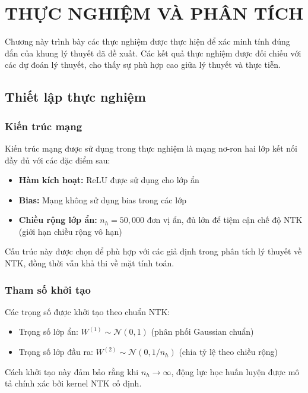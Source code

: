 \chapter{THỰC NGHIỆM VÀ PHÂN TÍCH}

Chương này trình bày các thực nghiệm được thực hiện để xác minh tính đúng đắn của khung lý thuyết đã đề xuất. Các kết quả thực nghiệm được đối chiếu với các dự đoán lý thuyết, cho thấy sự phù hợp cao giữa lý thuyết và thực tiễn.

\section{Thiết lập thực nghiệm}

\subsection{Kiến trúc mạng}

Kiến trúc mạng được sử dụng trong thực nghiệm là mạng nơ-ron hai lớp kết nối đầy đủ với các đặc điểm sau:
\begin{itemize}
    \item \textbf{Hàm kích hoạt:} ReLU được sử dụng cho lớp ẩn
    \item \textbf{Bias:} Mạng không sử dụng bias trong các lớp
    \item \textbf{Chiều rộng lớp ẩn:} $n_h = 50,000$ đơn vị ẩn, đủ lớn để tiệm cận chế độ NTK (giới hạn chiều rộng vô hạn)
\end{itemize}

Cấu trúc này được chọn để phù hợp với các giả định trong phân tích lý thuyết về NTK, đồng thời vẫn khả thi về mặt tính toán.

\subsection{Tham số khởi tạo}

Các trọng số được khởi tạo theo chuẩn NTK:
\begin{itemize}
    \item Trọng số lớp ẩn: $W^{(1)} \sim \mathcal{N}(0, 1)$ (phân phối Gaussian chuẩn)
    \item Trọng số lớp đầu ra: $W^{(2)} \sim \mathcal{N}(0, 1/n_h)$ (chia tỷ lệ theo chiều rộng)
\end{itemize}

Cách khởi tạo này đảm bảo rằng khi $n_h \rightarrow \infty$, động lực học huấn luyện được mô tả chính xác bởi kernel NTK cố định.

